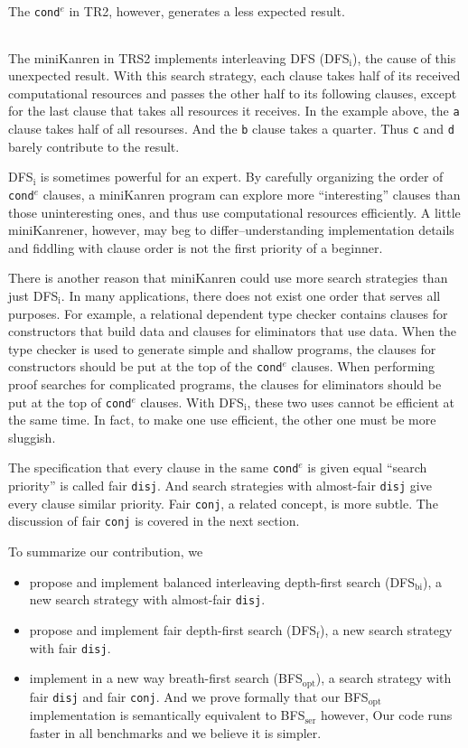 \documentclass[format=acmlarge, review=true, authordraft=true]{acmart}
\newcommand{\conde}{\texttt{cond$^e$}}
\newcommand{\conj}{\texttt{conj}}
\newcommand{\disj}{\texttt{disj}}
\newcommand{\clisting}[1]{
\begin{center}
  \begin{tabular}{c}
	
    \end{tabular}
\end{center}
}
\newcommand{\DFSi }[0]{DFS$_\textrm{i}$}
\newcommand{\DFSf }[0]{DFS$_\textrm{f}$}
\newcommand{\DFSbi}[0]{DFS$_\textrm{bi}$}
\newcommand{\BFSopt}[0]{BFS$_\textrm{opt}$}
\newcommand{\BFSser}[0]{BFS$_\textrm{ser}$}
\begin{document}
The \conde{} in TR2, however, generates a less expected result.

\clisting{Figures/run-repeato-idfs.rkt}

The miniKanren in TRS2 implements interleaving DFS (\DFSi), the cause of this 
unexpected result. With this search strategy, each clause takes half 
of its received computational resources and passes the other half to its 
following clauses, except for the last clause that takes all resources it 
receives. In the example above, the \texttt{a} clause takes half of all 
resourses. And the \texttt{b} clause takes a quarter. Thus \texttt{c} and 
\texttt{d} barely contribute to the result.


\DFSi{} is sometimes powerful for an expert. By carefully organizing the order 
of \conde{} clauses, a miniKanren program can explore more ``interesting'' 
clauses than those uninteresting ones, and thus use computational resources 
efficiently. A little miniKanrener, however, may beg to differ--understanding
implementation details and fiddling with clause order is not the first
priority of a beginner.

There is another reason that miniKanren could use more search strategies than
just \DFSi. In many applications, there does not exist one order that serves all purposes. For example, a relational dependent type checker contains
clauses for constructors that build data and clauses for eliminators that use
data. When the type checker is used to generate simple and shallow programs,
the clauses for constructors should be put at the top of the
\conde{} clauses.
When performing proof searches for complicated programs, the clauses for 
eliminators should be put at the top of \conde{} clauses. With \DFSi, these two uses cannot be 
efficient at the same time. In fact, to make one use efficient, the other one 
must be more sluggish.

The specification that every clause in the same \conde{} is given equal 
``search priority'' is called fair \disj{}. And search strategies with 
almost-fair \disj{} give every clause similar priority. 
Fair \conj{}, a related concept, is more subtle. The discussion of fair
\conj{} is covered in the next section.

To summarize our contribution, we
\begin{itemize}
	\item propose and implement balanced interleaving depth-first search 
	(\DFSbi{}), a new search strategy with almost-fair \disj{}.
	\item propose and implement fair depth-first search (\DFSf{}), a 
	new search strategy with fair \disj{}.
	\item implement in a new way breath-first search (\BFSopt), 
        a search strategy 
	with fair \disj{} and fair \conj{}. And we prove formally that our 
\BFSopt{} implementation is semantically equivalent to \BFSser
however, Our code runs faster in all benchmarks and we believe it is simpler.
\end{itemize}
\end{document}
